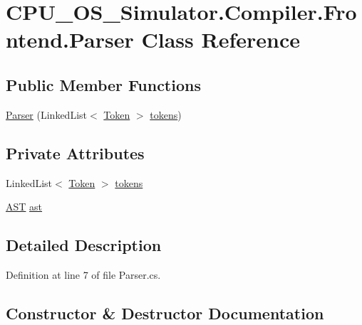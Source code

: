 \hypertarget{class_c_p_u___o_s___simulator_1_1_compiler_1_1_frontend_1_1_parser}{}\section{C\+P\+U\+\_\+\+O\+S\+\_\+\+Simulator.\+Compiler.\+Frontend.\+Parser Class Reference}
\label{class_c_p_u___o_s___simulator_1_1_compiler_1_1_frontend_1_1_parser}
\subsection*{Public Member Functions}
\begin{DoxyCompactItemize}
\item 
\hyperlink{class_c_p_u___o_s___simulator_1_1_compiler_1_1_frontend_1_1_parser_af0f1bfe1db9feba2284d5d7fc0a93d37}{Parser} (Linked\+List$<$ \hyperlink{class_c_p_u___o_s___simulator_1_1_compiler_1_1_frontend_1_1_tokens_1_1_token}{Token} $>$ \hyperlink{class_c_p_u___o_s___simulator_1_1_compiler_1_1_frontend_1_1_parser_a52ee7fdbe0d3af8e710c37ee6a149dc7}{tokens})
\end{DoxyCompactItemize}
\subsection*{Private Attributes}
\begin{DoxyCompactItemize}
\item 
Linked\+List$<$ \hyperlink{class_c_p_u___o_s___simulator_1_1_compiler_1_1_frontend_1_1_tokens_1_1_token}{Token} $>$ \hyperlink{class_c_p_u___o_s___simulator_1_1_compiler_1_1_frontend_1_1_parser_a52ee7fdbe0d3af8e710c37ee6a149dc7}{tokens}
\item 
\hyperlink{class_c_p_u___o_s___simulator_1_1_compiler_1_1_frontend_1_1_syntax_tree_1_1_a_s_t}{A\+S\+T} \hyperlink{class_c_p_u___o_s___simulator_1_1_compiler_1_1_frontend_1_1_parser_a05eafea853ea95d722ae4161e184f11a}{ast}
\end{DoxyCompactItemize}


\subsection{Detailed Description}


Definition at line 7 of file Parser.\+cs.



\subsection{Constructor \& Destructor Documentation}
\hypertarget{class_c_p_u___o_s___simulator_1_1_compiler_1_1_frontend_1_1_parser_af0f1bfe1db9feba2284d5d7fc0a93d37}{}
